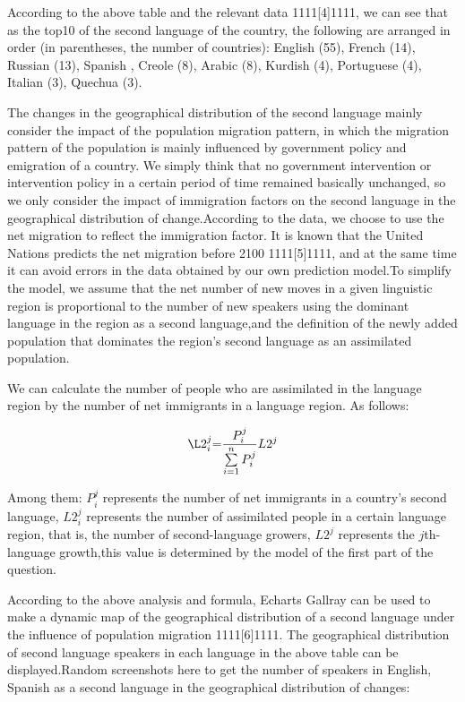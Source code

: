 \par According to the above table and the relevant data 1111[4]1111, we can see that as the top10 of the second language of the country, the following are arranged in order (in parentheses, the number of countries): English (55), French (14), Russian (13), Spanish , Creole (8), Arabic (8), Kurdish (4), Portuguese (4), Italian (3), Quechua (3).
\par The changes in the geographical distribution of the second language mainly consider the impact of the population migration pattern, in which the migration pattern of the population is mainly influenced by government policy and emigration of a country. We simply think that no government intervention or intervention policy in a certain period of time remained basically unchanged, so we only consider the impact of immigration factors on the second language in the geographical distribution of change.According to the data, we choose to use the net migration to reflect the immigration factor. It is known that the United Nations predicts the net migration before 2100 1111[5]1111, and at the same time it can avoid errors in the data obtained by our own prediction model.To simplify the model, we assume that the net number of new moves in a given linguistic region is proportional to the number of new speakers using the dominant language in the region as a second language,and the definition of the newly added population that dominates the region's second language as an assimilated population.
\par We can calculate the number of people who are assimilated in the language region by the number of net immigrants in a language region. As follows:

\begin{equation}
\L2_i^j{\rm{ = }}\frac{{P_i^j}}{{\sum\limits_{i = 1}^n {P_i^j} }}L{2^j}\label{aa1}
\end{equation}

\noindent Among them: $P_i^j$ represents the number of net immigrants in a country's second language, $L2_i^j$ represents the number of assimilated people in a certain language region, that is, the number of second-language growers, $L{2^j}$ represents the $j$th-language growth,this value is determined by the model of the first part of the question.
\par According to the above analysis and formula, Echarts Gallray can be used to make a dynamic map of the geographical distribution of a second language under the influence of population migration 1111[6]1111. The geographical distribution of second language speakers in each language in the above table can be displayed.Random screenshots here to get the number of speakers in English, Spanish as a second language in the geographical distribution of changes:

